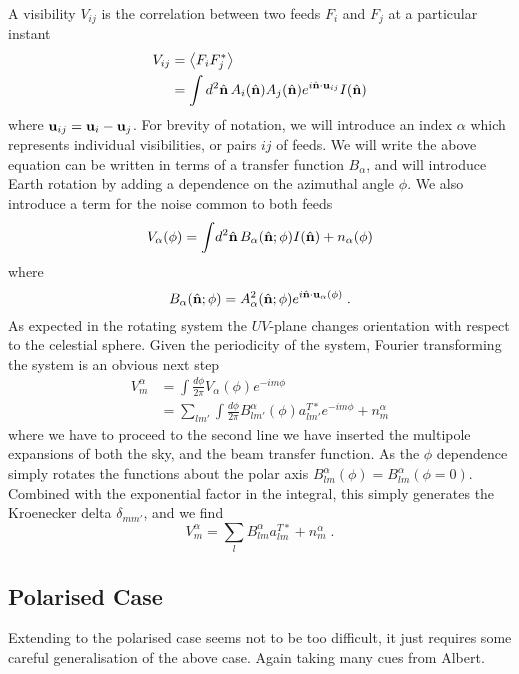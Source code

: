 \documentclass{revtex4}
\newcommand{\la}{\ensuremath{\left\langle}}
\newcommand{\ra}{\ensuremath{\right\rangle}}
\begin{document}
A visibility $V_{ij}$ is the correlation between two feeds $F_i$
and $F_j$ at a particular instant
\begin{align}
V_{ij} & = \la F_i F_j^* \ra \\
&= \int d^2\vnhat \, A_i(\vnhat) A_j(\vnhat) e^{i \vnhat \cdot
  \vu_{ij}} I(\vnhat)
\end{align}
where $\mathbf{u}_{ij} = \mathbf{u}_i - \mathbf{u}_j$. For brevity of notation, we will
introduce an index $\alpha$ which represents individual visibilities,
or pairs $ij$ of feeds. We will write the above equation can be written in terms of a
transfer function $B_\alpha$, and will introduce Earth rotation by
adding a dependence on the azimuthal angle $\phi$. We also introduce a
term for the noise common to both feeds 
\begin{equation}
V_\alpha(\phi) = \int \! d^2\hat{\mathbf{n}}\, B_\alpha(\hat{\mathbf{n}}; \phi) I(\hat{\mathbf{n}})
+ n_\alpha(\phi)
\end{equation}
where
\begin{equation}
B_\alpha(\hat{\mathbf{n}}; \phi) = A_\alpha^2(\hat{\mathbf{n}}; \phi) e^{i \hat{\mathbf{n}} \cdot
  \mathbf{u}_{\alpha}(\phi)} \; .
\end{equation}
As expected in the rotating system the $UV$-plane changes orientation
with respect to the celestial sphere. Given the periodicity of the
system, Fourier transforming the system is an obvious next step
\begin{align}
V^\alpha_m &= \int \frac{d\phi}{2\pi} V_\alpha(\phi) e^{-i m \phi} \\
& = \sum_{l m'}\int \frac{d\phi}{2\pi} B^\alpha_{l m'}(\phi) a^{T*}_{l
  m'}  e^{-i m \phi}+ n^\alpha_m
\end{align}
where we have to proceed to the second line we have inserted the
multipole expansions of both the sky, and the beam transfer
function. As the $\phi$ dependence simply rotates the functions about
the polar axis $B^\alpha_{lm}(\phi) =
B^{\alpha}_{lm}(\phi=0)$. Combined with the exponential factor in the
integral, this simply generates the Kroenecker delta $\delta_{mm'}$,
and we find
\begin{equation}
V^\alpha_m = \sum_{l} B^\alpha_{l m} a^{T*}_{l m}+ n^\alpha_m \; .
\end{equation}

\subsection{Polarised Case}

Extending to the polarised case seems not to be too difficult, it just
requires some careful generalisation of the above case. Again taking
many cues from Albert.
\end{document}
